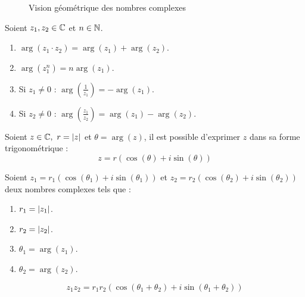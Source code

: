 \begin{figure}[!h]
	\centering
	\caption{Vision géométrique des nombres complexes}
\end{figure}

\begin{proposition}
	Soient $z_1, z_2 \in \mathbb{C}$ et $n \in \mathbb{N}$.
	\begin{enumerate}
		\item $\arg(z_1 \cdot z_2) = \arg(z_1) + \arg(z_2)$.
		\item $\arg(z_1^n) = n \arg(z_1)$.
		\item Si $z_1 \neq 0$ : $\arg \left(\frac{1}{z_1} \right) = - \arg(z_1)$.
		\item Si $z_2 \neq 0$ : $\arg \left( \frac{z_1}{z_2} \right) = \arg(z_1) - \arg(z_2)$.
	\end{enumerate}
\end{proposition}

\begin{definition}
	Soient $z \in \mathbb{C},\ r = \abs{z}$ et $\theta = \arg(z)$, il est possible d'exprimer $z$ dans sa forme trigonométrique :
	\[ z = r \left( \cos(\theta) + i \sin(\theta) \right) \]
\end{definition}

\begin{proposition}
	Soient $z_1 = r_1 \left( \cos(\theta_1) + i \sin(\theta_1) \right)$ et $z_2 = r_2 \left( \cos(\theta_2) + i \sin(\theta_2) \right)$ deux nombres complexes tels que :
	\begin{enumerate}
			\item $r_1 = \abs{z_1}$.
			\item $r_2 = \abs{z_2}$.
			\item $\theta_1 = \arg(z_1)$.
			\item $\theta_2 = \arg(z_2)$.
		\end{enumerate}
	\[ z_1 z_2 = r_1 r_2 \left( \cos(\theta_1+\theta_2) + i \sin(\theta_1+ \theta_2) \right) \]
\end{proposition}

